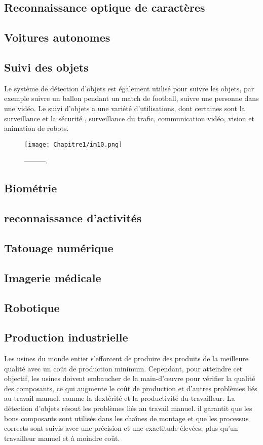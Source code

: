 \subsection{Reconnaissance optique de caractères}

\subsection{Voitures autonomes}

\subsection{Suivi des objets}
Le système de détection d'objets est également utilisé pour suivre les objets, par exemple suivre un ballon pendant un match de football, suivre une personne dans une vidéo. Le suivi d'objets a une variété d'utilisations, dont certaines sont la surveillance et la sécurité , surveillance du trafic, communication vidéo, vision et animation de robots.

\begin{figure}[H]
\centering
\texttt{[image: Chapitre1/im10.png]}
\caption{---------.}
\label{im10}
\end{figure}

\subsection{Biométrie}

\subsection{reconnaissance d'activités}

\subsection{Tatouage numérique}

\subsection{Imagerie médicale}

\subsection{Robotique}

\subsection{Production industrielle}
Les usines du monde entier s'efforcent de produire des produits de la
meilleure qualité avec un coût de production minimum. Cependant, pour
atteindre cet objectif, les usines doivent embaucher de la main-d'œuvre pour vérifier la qualité des composants, ce qui augmente le coût de production et d'autres problèmes liés au travail manuel. comme la dextérité et la productivité du travailleur. La détection d'objets résout les problèmes liés au travail manuel. il garantit que les bons composants sont utilisés dans les chaînes de montage et que les processus corrects sont suivis avec une précision et une exactitude élevées, plus qu'un travailleur manuel et à moindre coût.

